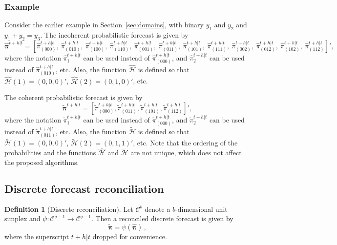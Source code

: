 \documentclass[a4paper,review,11pt,authoryear]{elsarticle}
\newcommand{\bpi}{\bm{\pi}}
\theoremstyle{definition}
\newtheorem{definition}{Definition}[section]
\begin{document}
  \subsubsection*{\textbf{Example}}

  Consider the earlier example in Section~\ref{sec:domains}, with binary $y_1$ and $y_2$ and $y_1+y_2=y_3$. The incoherent probabilistic forecast is given by
  \[
    \hat{\bpi}^{t+h|t}= \left[
      \hat{\pi}^{t+h|t}_{(000)}, ~
       \hat{\pi}^{t+h|t}_{(010)},~
       \hat{\pi}^{t+h|t}_{(100)},~
       \hat{\pi}^{t+h|t}_{(110)},~
       \hat{\pi}^{t+h|t}_{(001)},~
       \hat{\pi}^{t+h|t}_{(011)},~
       \hat{\pi}^{t+h|t}_{(101)},~
       \hat{\pi}^{t+h|t}_{(111)},~
       \hat{\pi}^{t+h|t}_{(002)},~
       \hat{\pi}^{t+h|t}_{(012)},~
       \hat{\pi}^{t+h|t}_{(102)},~
       \hat{\pi}^{t+h|t}_{(112)}
       \right]',
  \]
  where the notation $\hat{\pi}^{t+h|t}_{1}$ can be used instead of $\hat{\pi}^{t+h|t}_{(000)}$, and $\hat{\pi}^{t+h|t}_{2}$ can be used instead of $\hat{\pi}^{t+h|t}_{(010)}$, etc. Also, the function $\hat{\mathcal{H}}$ is defined so that $\hat{\mathcal{H}}(1)=(0,0,0)'$, $\hat{\mathcal{H}}(2)=(0,1,0)'$, etc.

  The coherent probabilistic forecast is given by
  \[
  \tilde{\bpi}^{t+h|t}=\left[
  \tilde{\pi}^{t+h|t}_{(000)},
  \tilde{\pi}^{t+h|t}_{(011)},
  \tilde{\pi}^{t+h|t}_{(101)},
  \tilde{\pi}^{t+h|t}_{(112)}
  \right]',\]
  where the notation $\tilde{\pi}^{t+h|t}_{1}$ can be used instead of $\tilde{\pi}^{t+h|t}_{(000)}$, and $\tilde{\pi}^{t+h|t}_{2}$ can be used instead of $\tilde{\pi}^{t+h|t}_{(011)}$, etc. Also, the function $\tilde{\mathcal{H}}$ is defined so that $\tilde{\mathcal{H}}(1)=(0,0,0)'$, $\tilde{\mathcal{H}}(2)=(0,1,1)'$, etc. Note that the ordering of the probabilities and the functions $\hat{\mathcal{H}}$ and $\tilde{\mathcal{H}}$ are not unique, which does not affect the proposed algorithms.

  \subsection{Discrete forecast reconciliation}\label{sec:discrec}
  
   \begin{definition}[Discrete reconciliation]
  	
  	Let $\mathcal{C}^{b}$ denote a $b$-dimensional unit simplex and $\psi:\mathcal{C}^{q-1} \rightarrow \mathcal{C}^{q-1}$.	Then a reconciled discrete forecast is given by 
  	\[
  	  \tilde{\bpi} = \psi(\hat{\bpi})\,,
  	\]
    where the superscript $t+h|t$ dropped for convenience.
   \end{definition}
    
\end{document}
